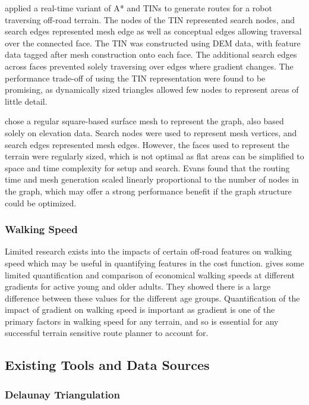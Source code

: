 \documentclass[12pt]{article}
\begin{document}
\textcite{perkins2013fielddstar} applied a real-time variant of A* and TINs to generate routes for a robot traversing off-road terrain. The nodes of the TIN represented search nodes, and search edges represented mesh edge as well as conceptual edges allowing traversal over the connected face. The TIN was constructed using DEM data, with feature data tagged after mesh construction onto each face. The additional search edges across faces prevented solely traversing over edges where gradient changes. The performance trade-off of using the TIN representation were found to be promising, as dynamically sized triangles allowed few nodes to represent areas of little detail.

\textcite{evans2023tsr} chose a regular square-based surface mesh to represent the graph, also based solely on elevation data. Search nodes were used to represent mesh vertices, and search edges represented mesh edges. However, the faces used to represent the terrain were regularly sized, which is not optimal as flat areas can be simplified to space and time complexity for setup and search. Evans found that the routing time and mesh generation scaled linearly proportional to the number of nodes in the graph, which may offer a strong performance benefit if the graph structure could be optimized.


\subsubsection{Walking Speed}

Limited research exists into the impacts of certain off-road features on walking speed which may be useful in quantifying features in the cost function. \autocite{horiuchi2015comparisons} gives some limited quantification and comparison of economical walking speeds at different gradients for active young and older adults. They showed there is a large difference between these values for the different age groups. Quantification of the impact of gradient on walking speed is important as gradient is one of the primary factors in walking speed for any terrain, and so is essential for any successful terrain sensitive route planner to account for.

\subsection{Existing Tools and Data Sources}

\subsubsection{Delaunay Triangulation}
\end{document}
